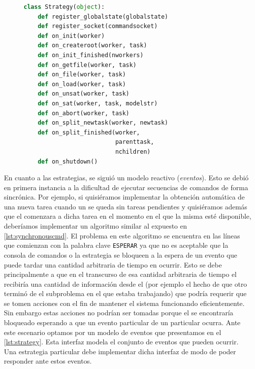 \begin{figure}
\begin{footnotesize}
\begin{lstlisting}[language=Python,caption=Interfaz Strategy,label=lst:strategy]
class Strategy(object):
	def register_globalstate(globalstate)
	def register_socket(commandsocket)
	def on_init(worker)
	def on_createroot(worker, task)
	def on_init_finished(nworkers)
	def on_getfile(worker, task)
	def on_file(worker, task)
	def on_load(worker, task)
	def on_unsat(worker, task)
	def on_sat(worker, task, modelstr)
	def on_abort(worker, task)
	def on_split_newtask(worker, newtask)
	def on_split_finished(worker, 
	                      parenttask, 
	                      nchildren)
	def on_shutdown()
\end{lstlisting}
\end{footnotesize}
\end{figure}

En cuanto a las estrategias, se siguió un modelo reactivo (\emph{eventos}).
Esto se debió en primera instancia a la dificultad de ejecutar secuencias de
comandos de forma sincrónica. Por ejemplo, si quisiéramos implementar la
obtención automática de una nueva tarea cuando un \w se queda sin tareas
pendientes y quisiéramos además que el \w comenzara a \solvear dicha tarea en
el momento en el que la misma esté disponible, deberíamos implementar un
algoritmo similar al expuesto en \lst\ref{lst:synchronouscmd}. El problema en
este algoritmo se encuentra en las líneas que comienzan con la palabra clave
\texttt{ESPERAR} ya que no es aceptable que la consola de comandos o la
estrategia se bloqueen a la espera de un evento que puede tardar una cantidad
arbitraria de tiempo en ocurrir. Esto se debe principalmente a que en el
transcurso de esa cantidad arbitraria de tiempo el \fend recibiría una
cantidad de información desde el \bend (por ejemplo el hecho de que otro \w
terminó de \solvear el subproblema en el que estaba trabajando) que podría
requerir que se tomen acciones con el fin de mantener el sistema funcionando
eficientemente. Sin embargo estas acciones no podrían ser tomadas porque el
\fend se encontraría bloqueado esperando a que un evento particular de un \w
particular ocurra. Ante este escenario optamos por un modelo de eventos que
presentamos en el \lst\ref{lst:strategy}. Esta interfaz modela el conjunto de
eventos que pueden ocurrir. Una estrategia particular debe implementar dicha
interfaz de modo de poder responder ante estos eventos.



